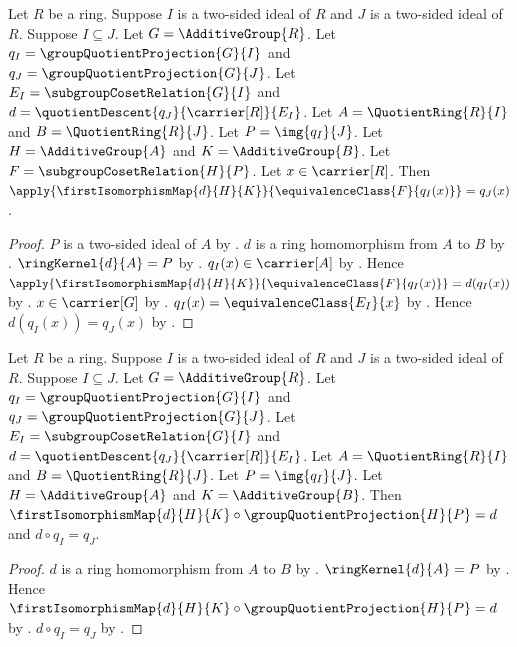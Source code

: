 \begin{proposition}\label{ring_third_isomorphism_map_apply}
    Let $R$ be a ring.
    Suppose $I$ is a two-sided ideal of $R$ and
        $J$ is a two-sided ideal of $R$.
    Suppose $I\subseteq J$.
    Let $G=\AdditiveGroup{R}$.
    Let $q_I=\groupQuotientProjection{G}{I}$ and
        $q_J=\groupQuotientProjection{G}{J}$.
    Let $E_I=\subgroupCosetRelation{G}{I}$ and
        $d=\quotientDescent{q_J}{\carrier[R]}{E_I}$.
    Let $A=\QuotientRing{R}{I}$ and $B=\QuotientRing{R}{J}$.
    Let $P=\img{q_I}{J}$.
    Let $H=\AdditiveGroup{A}$ and $K=\AdditiveGroup{B}$.
    Let $F=\subgroupCosetRelation{H}{P}$.
    Let $x\in\carrier[R]$.
    Then
        $\apply{\firstIsomorphismMap{d}{H}{K}}{
            \equivalenceClass{F}{q_I(x)}}=q_J(x)$.
\end{proposition}
\begin{proof}
    $P$ is a two-sided ideal of $A$ by
        .
    $d$ is a ring homomorphism from $A$ to $B$ by
        .
    $\ringKernel{d}{A}=P$ by
        .
    $q_I(x)\in\carrier[A]$ by
        .
    Hence
        $\apply{\firstIsomorphismMap{d}{H}{K}}{
            \equivalenceClass{F}{q_I(x)}}=d(q_I(x))$ by
        .
    $x\in\carrier[G]$ by .
    $q_I(x)=\equivalenceClass{E_I}{x}$ by
        .
    Hence $d(q_I(x))=q_J(x)$ by
        .
\end{proof}

\begin{theorem}\label{ring_third_isomorphism_factorization}
    Let $R$ be a ring.
    Suppose $I$ is a two-sided ideal of $R$ and
        $J$ is a two-sided ideal of $R$.
    Suppose $I\subseteq J$.
    Let $G=\AdditiveGroup{R}$.
    Let $q_I=\groupQuotientProjection{G}{I}$ and
        $q_J=\groupQuotientProjection{G}{J}$.
    Let $E_I=\subgroupCosetRelation{G}{I}$ and
        $d=\quotientDescent{q_J}{\carrier[R]}{E_I}$.
    Let $A=\QuotientRing{R}{I}$ and $B=\QuotientRing{R}{J}$.
    Let $P=\img{q_I}{J}$.
    Let $H=\AdditiveGroup{A}$ and $K=\AdditiveGroup{B}$.
    Then
        $\firstIsomorphismMap{d}{H}{K}\circ
            \groupQuotientProjection{H}{P}=d$ and
        $d\circ q_I=q_J$.
\end{theorem}
\begin{proof}
    $d$ is a ring homomorphism from $A$ to $B$ by
        .
    $\ringKernel{d}{A}=P$ by
        .
    Hence
        $\firstIsomorphismMap{d}{H}{K}\circ
            \groupQuotientProjection{H}{P}=d$ by
        .
    $d\circ q_I=q_J$ by
        .
\end{proof}

